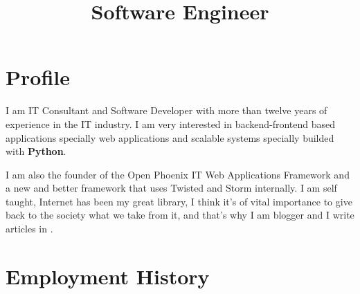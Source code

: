 \documentclass[11pt,a4paper,sans]{moderncv}
\title{Software Engineer}
\begin{document}
\maketitle

\section{Profile}
I am IT Consultant and Software Developer with more than
twelve years of experience in the IT industry. I am very interested in
backend-frontend based applications specially web applications and scalable
systems specially builded with {\bfseries Python}.

I am also the founder of 
the Open Phoenix IT Web Applications Framework and  a new and better framework that uses Twisted and Storm internally. I am self taught, Internet has been my great library, I think it's of
vital importance to give back to the society what we take from it, and that's
why I am blogger and I write articles in .

\section{Employment History}
\end{document}
